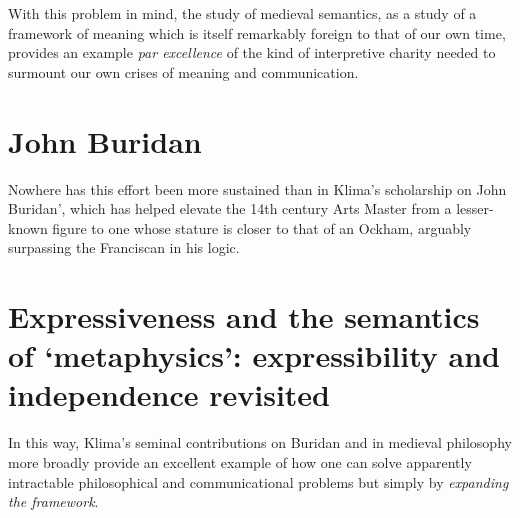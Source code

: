 \documentclass[]{article}
\begin{document}
With this problem in mind, the study of medieval semantics, 
as a study of a framework of meaning which is itself remarkably foreign to that of our own time, 
provides an example \emph{par excellence} of the kind of interpretive charity needed to surmount our own crises of meaning and communication. 
\section{John Buridan}
Nowhere has this effort been more sustained than in Klima's scholarship on John Buridan', 
which has helped elevate the 14th century Arts Master from a lesser-known figure to one whose stature is closer to that of an Ockham, 
arguably surpassing the Franciscan in his logic.

\section{Expressiveness and the semantics of `metaphysics': expressibility and independence revisited}
In this way, 
Klima's seminal contributions on Buridan and in medieval philosophy more broadly provide an excellent example of how one can solve apparently intractable philosophical and communicational problems 
but simply by \emph{expanding the framework}.
\end{document}
